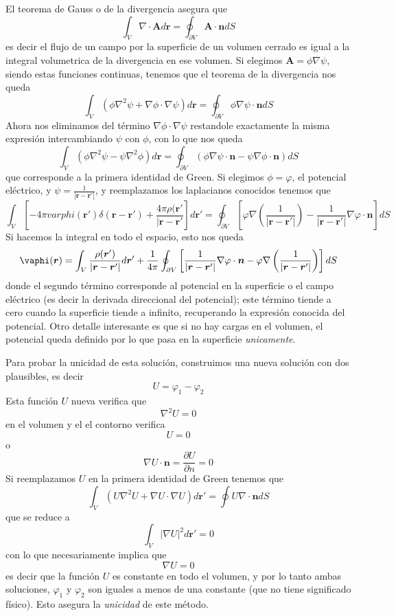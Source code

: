\documentclass[a4paper]{article}
\numberwithin{equation}{section} %
\renewcommand{\vec}[1]{\boldsymbol{#1}}
\newcommand{\rinv}{\frac{1}{|\vec{r} - \vec{r}'|}}
\begin{document}
El teorema de Gauss o de la divergencia asegura que
\begin{equation}
	\int_{V} \nabla \cdot \vec{A} d\vec{r} = \oint_{\partial V} \vec{A} \cdot \vec{n} dS
\end{equation}
es decir el flujo de un campo por la superficie de un volumen cerrado es igual a la integral volumetrica de la divergencia en ese volumen. Si elegimos $\vec{A} = \phi \nabla \psi$, siendo estas funciones continuas, tenemos que el teorema de la divergencia nos queda
\[ \int_{V} (\phi \nabla^2 \psi + \nabla \phi \cdot \nabla \psi) d\vec{r} = \oint_{\partial V} \phi \nabla \psi \cdot \vec{n} dS \]
Ahora nos eliminamos del término $\nabla \phi \cdot \nabla \psi$ restandole exactamente la misma expresión intercambiando $\psi$ con $\phi$, con lo que nos queda
\begin{equation}
	\int_{V} (\phi \nabla^2 \psi - \psi \nabla^2 \phi) d\vec{r} = \oint_{\partial V} (\phi \nabla \psi \cdot \vec{n} - \psi \nabla \phi \cdot \vec{n}) dS
\end{equation}
que corresponde a la primera identidad de Green. Si elegimos $\phi = \varphi$, el potencial eléctrico, y $\psi = \frac{1}{|\vec{r} - \vec{r}'|}$, y reemplazamos los laplacianos conocidos tenemos que
\[ \int_{V} \left[ - 4\pi varphi(\vec{r}') \delta(\vec{r} - \vec{r}') + \frac{4\pi \rho(\vec{r}'}{|\vec{r} - \vec{r}'} \right] d\vec{r}' = \oint_{\partial V} \left[\varphi \nabla \left(\frac{1}{|\vec{r} - \vec{r}'|}\right) - \rinv \nabla \varphi \cdot \vec{n} \right] dS \]
Si hacemos la integral en todo el espacio, esto nos queda
\begin{equation}
	\vaphi(\vec{r}) = \int_{V} \frac{\rho(\vec{r}')}{|\vec{r} - \vec{r}'|} d\vec{r}' + \frac{1}{4\pi} \oint_{\partial V} \left[\rinv \nabla \varphi \cdot \vec{n} - \varphi \nabla \left(\frac{1}{|\vec{r} - \vec{r}'|}\right)  \right] dS
	\label{eq:electroestatica_potencial_integral_contorno}
\end{equation}
donde el segundo término corresponde al potencial en la superficie o el campo eléctrico (es decir la derivada direccional del potencial); este término tiende a cero cuando la  superficie tiende a infinito, recuperando la expresión conocida del potencial. Otro detalle interesante es que si no hay cargas en el volumen, el potencial queda definido por lo que pasa en la superficie \emph{unicamente}.

Para probar la unicidad de esta solución, construimos una nueva solución con dos plausibles, es decir
\[ U = \varphi_1 - \varphi_2 \]
Esta función $U$ nueva verifica que 
\[ \nabla^2 U = 0 \]
en el volumen y el el contorno verifica 
\[ U = 0 \]
o 
\[ \nabla U \cdot \vec{n} = \frac{\partial U}{\partial n} = 0 \]
Si reemplazamos $U$ en la primera identidad de Green tenemos que
\[ \int_{V} (U \nabla^2 U + \nabla U \cdot \nabla U) d\vec{r}' = \oint U \nabla \cdot \vec{n} dS \]
que se reduce a
\[ \int_{V} |\nabla U|^2 d\vec{r}' = 0 \]
con lo que necesariamente implica que
\[ \nabla U = 0\]
es decir que la función $U$ es constante en todo el volumen, y por lo tanto ambas soluciones, $\varphi_1$ y $\varphi_2$ son iguales a menos de una constante (que no tiene significado físico). Esto asegura la \emph{unicidad} de este método.
\end{document}
